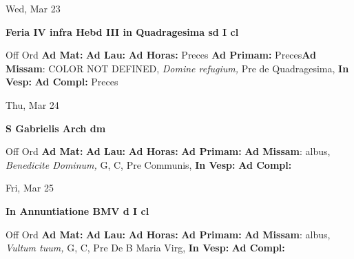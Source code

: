 \documentclass[10pt]{book}
\begin{document}
\begin{center}
\begin{minipage}{3.5in}
\vspace{2em}
\begin{center}Wed, Mar 23
\end{center}
\textbf{ \large Feria IV infra Hebd III in Quadragesima
\textnormal{\normalsize sd I cl}}

\begin{justify}Off Ord
\textbf{Ad Mat: }
\textbf{Ad Lau: }
\textbf{Ad Horas: }Preces
\textbf{Ad Primam: }Preces\textbf{Ad Missam}: COLOR NOT DEFINED, \textit{Domine refugium,} Pre de Quadragesima, 
\textbf{In Vesp: }
\textbf{Ad Compl: }Preces
\end{justify}
\end{minipage}
\end{center}

\begin{center}
\begin{minipage}{3.5in}
\vspace{2em}
\begin{center}Thu, Mar 24
\end{center}
\textbf{ \large S Gabrielis Arch
\textnormal{\normalsize dm}}

\begin{justify}Off Ord
\textbf{Ad Mat: }
\textbf{Ad Lau: }
\textbf{Ad Horas: }
\textbf{Ad Primam: }\textbf{Ad Missam}: albus, \textit{Benedicite Dominum,} G, C, Pre Communis, 
\textbf{In Vesp: }
\textbf{Ad Compl: }
\end{justify}
\end{minipage}
\end{center}

\begin{center}
\begin{minipage}{3.5in}
\vspace{2em}
\begin{center}Fri, Mar 25
\end{center}
\textbf{ \large In Annuntiatione BMV
\textnormal{\normalsize d I cl}}

\begin{justify}Off Ord
\textbf{Ad Mat: }
\textbf{Ad Lau: }
\textbf{Ad Horas: }
\textbf{Ad Primam: }\textbf{Ad Missam}: albus, \textit{Vultum tuum,} G, C, Pre De B Maria Virg, 
\textbf{In Vesp: }
\textbf{Ad Compl: }
\end{justify}
\end{minipage}
\end{center}
\end{document}
